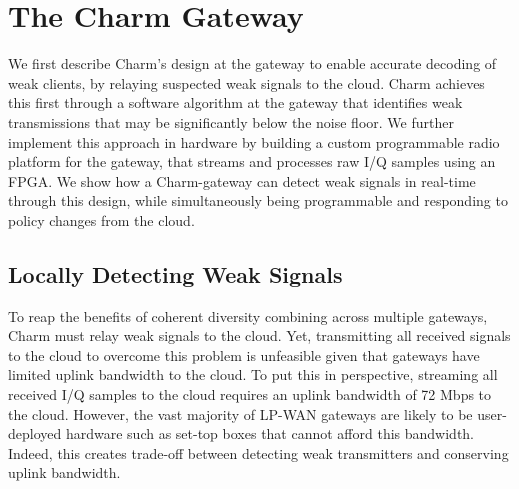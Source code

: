 \section{The Charm Gateway}
\label{sec:gateway}



We first describe Charm's design at the gateway to enable accurate decoding of
weak clients, by relaying suspected weak signals to the cloud. Charm achieves
this first through a software algorithm at the gateway that identifies weak
transmissions that may be significantly below the noise floor. We further
implement this approach in hardware by building a custom programmable radio
platform for the gateway, that streams and processes raw I/Q samples using an
FPGA. We show how a Charm-gateway can detect weak signals in real-time through
this design, while simultaneously being programmable and responding to policy
changes from the cloud.

\subsection{Locally Detecting Weak Signals}
\label{sec:local-detection}

To reap the benefits of coherent diversity combining across multiple gateways,
Charm must relay weak signals to the cloud.  Yet,
transmitting all received signals to the cloud to overcome this problem is
unfeasible given that gateways have limited uplink bandwidth to the cloud. To
put this in perspective, streaming all received I/Q samples to the cloud
requires an uplink bandwidth of 72 Mbps to the cloud. However, the vast
majority of LP-WAN gateways are likely to be user-deployed hardware such as
set-top boxes that cannot afford this bandwidth. Indeed, this creates
trade-off between detecting weak transmitters and conserving uplink
bandwidth.

